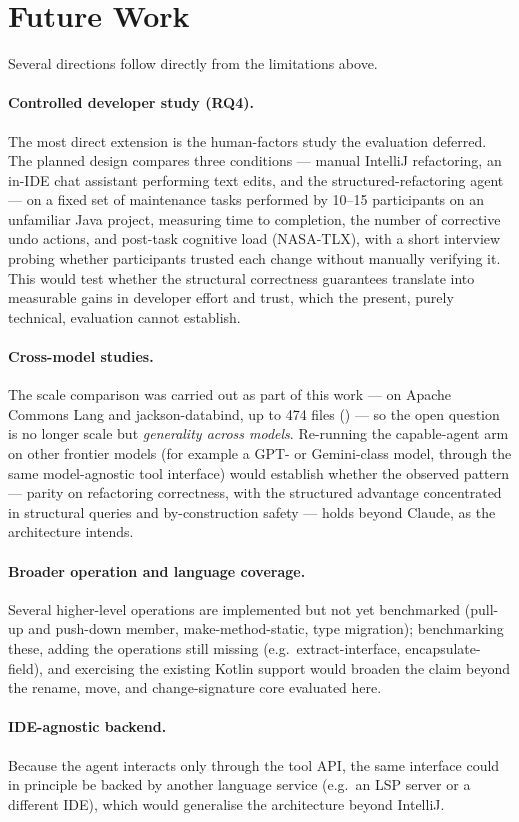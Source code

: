 \section{Future Work}
\label{sec:concl-future}
Several directions follow directly from the limitations above.

\paragraph{Controlled developer study (RQ4).} The most direct extension is the
human-factors study the evaluation deferred. The planned design compares three
conditions --- manual IntelliJ refactoring, an in-IDE chat assistant performing
text edits, and the structured-refactoring agent --- on a fixed set of maintenance
tasks performed by 10--15 participants on an unfamiliar Java project, measuring
time to completion, the number of corrective undo actions, and post-task cognitive
load (NASA-TLX), with a short interview probing whether participants trusted each
change without manually verifying it. This would test whether the structural
correctness guarantees translate into measurable gains in developer effort and
trust, which the present, purely technical, evaluation cannot establish.

\paragraph{Cross-model studies.} The scale comparison was carried out as part of this
work --- on Apache Commons Lang and jackson-databind, up to 474 files
() --- so the open question is no longer scale but
\emph{generality across models}. Re-running the capable-agent arm on other frontier
models (for example a GPT- or Gemini-class model, through the same model-agnostic tool
interface) would establish whether the observed pattern --- parity on refactoring
correctness, with the structured advantage concentrated in structural queries and
by-construction safety --- holds beyond Claude, as the architecture intends.

\paragraph{Broader operation and language coverage.} Several higher-level operations
are implemented but not yet benchmarked (pull-up and push-down member,
make-method-static, type migration); benchmarking these, adding the operations still
missing (e.g.\ extract-interface, encapsulate-field), and exercising the existing Kotlin
support would broaden the claim beyond the rename, move, and change-signature core
evaluated here. \paragraph{IDE-agnostic backend.}
Because the agent interacts only through the tool API, the same interface could in
principle be backed by another language service (e.g.\ an LSP server or a
different IDE), which would generalise the architecture beyond IntelliJ.

